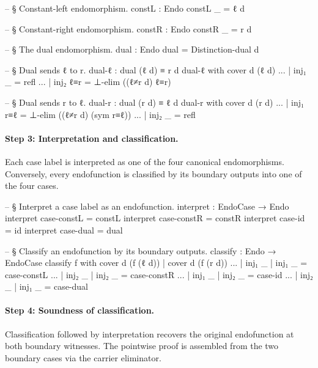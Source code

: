 \documentclass[11pt,a4paper]{book}
\begin{document}
\begin{code}
  -- § Constant-left endomorphism.
  constL : Endo
  constL _ = ℓ d

  -- § Constant-right endomorphism.
  constR : Endo
  constR _ = r d

  -- § The dual endomorphism.
  dual : Endo
  dual = Distinction-dual d

  -- § Dual sends ℓ to r.
  dual-ℓ : dual (ℓ d) ≡ r d
  dual-ℓ with cover d (ℓ d)
  ... | inj₁ _   = refl
  ... | inj₂ ℓ≡r = ⊥-elim ((ℓ≠r d) ℓ≡r)

  -- § Dual sends r to ℓ.
  dual-r : dual (r d) ≡ ℓ d
  dual-r with cover d (r d)
  ... | inj₁ r≡ℓ = ⊥-elim ((ℓ≠r d) (sym r≡ℓ))
  ... | inj₂ _   = refl
\end{code}

\paragraph{Step 3: Interpretation and classification.}
Each case label is interpreted as one of the four canonical endomorphisms.
Conversely, every endofunction is classified by its boundary outputs into one of the four cases.

\begin{code}
  -- § Interpret a case label as an endofunction.
  interpret : EndoCase → Endo
  interpret case-constL = constL
  interpret case-constR = constR
  interpret case-id     = id
  interpret case-dual   = dual

  -- § Classify an endofunction by its boundary outputs.
  classify : Endo → EndoCase
  classify f with cover d (f (ℓ d)) | cover d (f (r d))
  ... | inj₁ _ | inj₁ _ = case-constL
  ... | inj₂ _ | inj₂ _ = case-constR
  ... | inj₁ _ | inj₂ _ = case-id
  ... | inj₂ _ | inj₁ _ = case-dual
\end{code}

\paragraph{Step 4: Soundness of classification.}
Classification followed by interpretation recovers the original endofunction at both boundary witnesses.
The pointwise proof is assembled from the two boundary cases via the carrier eliminator.
\end{document}
